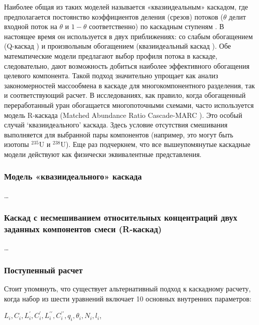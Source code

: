 Наиболее общая из таких моделей называется «квазиидеальным» каскадом, где предполагается постоянство коэффициентов деления (срезов) потоков ($\theta$ делит входной поток на $\theta$ и $1 - \theta$ соответственно) по каскадным ступеням \cite{yamamotoMulticomponentIsotopeSeparating1978}. В настоящее время он используется в двух приближениях: со слабым обогащением (Q-каскад \cite{borisevichNewApproachOptimize2011, kolokoltsovDesignCascadesSeparating1970, zengQCascadeExplanation2012}) и произвольным обогащением (квазиидеальный каскад \cite{sulaberidzeSpecialFeaturesEnrichment2006}). Обе математические модели предлагают выбор профиля потока в каскаде, следовательно, дают возможность добиться наиболее эффективного обогащения целевого компонента. Такой подход значительно упрощает как анализ закономерностей массообмена в каскаде для многокомпонентного разделения, так и соответствующий расчет. В исследованиях, как правило, когда обогащенный переработанный уран обогащается многопоточными схемами, часто используется модель R-каскада (Matched Abundance Ratio Cascade-MARC \cite{delagarzaMulticomponentIsotopeSeparation1961, woodEffectsSeparationProcesses2008, kazukihidaSimultaneousEvaluationEffects}). Это особый случай `квазиидеального' каскада. Здесь условие отсутствия смешивания выполняется для выбранной пары компонентов (например, это могут быть изотопы $^{235}$U и $^{238}$U). Еще раз подчеркнем, что все вышеупомянутые каскадные модели действуют как физически эквивалентные представления.


\subsubsection{Модель «квазиидеального» каскада}
\dots

\subsubsection{Каскад с несмешиванием относительных концентраций двух заданных компонентов смеси (R-каскад)}
\dots


\subsubsection{Поступенный расчет}

Стоит упомянуть, что существует альтернативный подход к каскадному расчету, когда набор из шести уравнений включает 10 основных внутренних параметров:

$L_{i}, C_{i}, L_{i}^{\prime}, C_{i}^{\prime}, L_{i}^{\prime \prime}, C_{i}^{\prime \prime}, q_{i}, \theta_{i}, N_{i}, l_{i}$,

